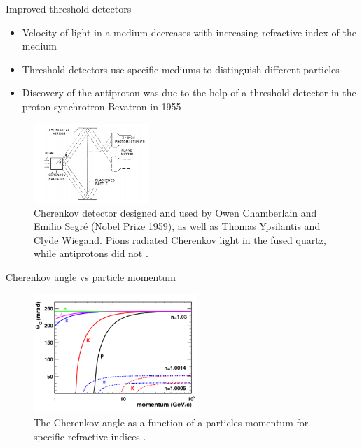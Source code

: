 \documentclass[aspectratio=1610, 10pt]{beamer}
\begin{document}
\begin{frame}{Improved threshold detectors}
  \begin{itemize}
    \item Velocity of light in a medium decreases with increasing refractive index of the medium
    \medskip
    \item Threshold detectors use specific mediums to distinguish different particles
    \medskip
    \item Discovery of the antiproton was due to the help of a threshold detector in the proton synchrotron Bevatron in 1955
  \end{itemize}
  \begin{figure}
    \includegraphics[width=0.39\textwidth]{images/proton.png}
    \caption{Cherenkov detector designed and used by Owen
     Chamberlain and Emilio Segré (Nobel Prize 1959), as well as Thomas Ypsilantis and Clyde Wiegand.
     Pions radiated Cherenkov light in the fused quartz, while antiprotons did not \cite{gaseous}.}
  \end{figure}
\end{frame}


\begin{frame}{Cherenkov angle vs particle momentum}
  \begin{figure}
    \includegraphics[width=0.55\textwidth]{images/angle_momentum.png}
    \caption{The Cherenkov angle as a function of a particles momentum for specific refractive indices \cite{hep}.}
  \end{figure}
\end{frame}
\end{document}
